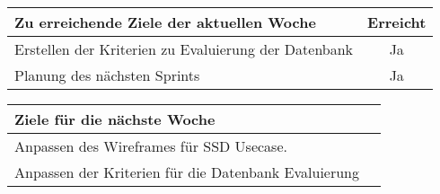 \begin{tabularx}{\textwidth}{Xc}
    \arrayrulecolor{OliveGreen}
    \toprule
    {\bfseries Zu erreichende Ziele der aktuellen Woche} & {\bfseries Erreicht} \\
    \midrule[2pt]
    Erstellen der Kriterien zu Evaluierung der Datenbank  &Ja                    \\
    \rowcolor{OliveGreen!15}
    Planung des nächsten Sprints                          &Ja                    \\
     \bottomrule[2pt]
\end{tabularx}
%
\vspace{1cm}
%
\begin{tabularx}{\textwidth}{Xc}
    \arrayrulecolor{OliveGreen}
    \toprule
    {\bfseries Ziele für die nächste Woche}              &                      \\
    \midrule[2pt]
    Anpassen des Wireframes für SSD Usecase.            &                      \\
    \rowcolor{OliveGreen!15}
    Anpassen der Kriterien für die Datenbank Evaluierung &                      \\
\end{tabularx}
